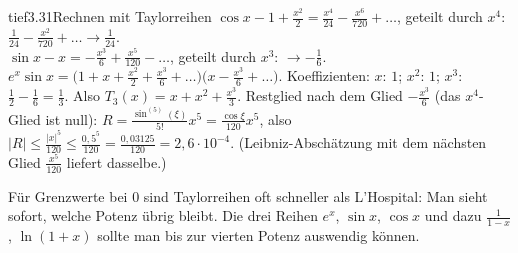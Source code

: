 \begin{loesungkarte}{tief}{3.31}{Rechnen mit Taylorreihen}
$\cos x - 1 + \frac{x^{2}}2 = \frac{x^{4}}{24} - \frac{x^{6}}{720} + \dots$, geteilt durch $x^{4}$: $\frac1{24} - \frac{x^{2}}{720} + \dots\to\frac1{24}$. \\
$\sin x - x = -\frac{x^{3}}6 + \frac{x^{5}}{120} - \dots$, geteilt durch $x^{3}$: $\to-\frac16$.
$e^{x}\sin x = \bigl(1 + x + \frac{x^{2}}2 + \frac{x^{3}}6 + \dots\bigr)\bigl(x - \frac{x^{3}}6 + \dots\bigr)$. Koeffizienten: $x$: $1$; $x^{2}$: $1$; $x^{3}$: $\frac12 - \frac16 = \frac13$. Also $T_3(x) = x + x^{2} + \frac{x^{3}}3$.
Restglied nach dem Glied $-\frac{x^{3}}6$ (das $x^{4}$-Glied ist null): $R = \frac{\sin^{(5)}(\xi)}{5!}x^{5} = \frac{\cos\xi}{120}x^{5}$, also $|R|\le\frac{|x|^{5}}{120}\le\frac{0{,}5^{5}}{120} = \frac{0{,}03125}{120} = 2{,}6\cdot10^{-4}$. (Leibniz-Abschätzung mit dem nächsten Glied $\frac{x^{5}}{120}$ liefert dasselbe.)
\begin{mitnehmen}\kastentext
Für Grenzwerte bei $0$ sind Taylorreihen oft schneller als L'Hospital: Man sieht sofort, welche Potenz übrig bleibt. Die drei Reihen $e^{x}$, $\sin x$, $\cos x$ und dazu $\frac1{1 - x}$, $\ln(1 + x)$ sollte man bis zur vierten Potenz auswendig können.
\end{mitnehmen}
\end{loesungkarte}

